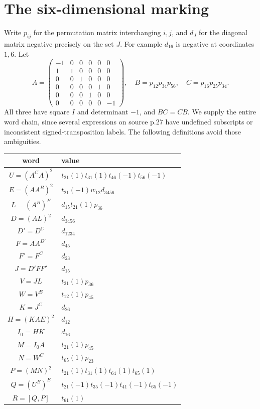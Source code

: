 \documentclass[11pt,a4paper]{article}
\begin{document}
\section{The six-dimensional marking}
Write $p_{ij}$ for the permutation matrix interchanging $i,j$, and
$d_J$ for the diagonal matrix negative precisely on the set $J$.
For example $d_{16}$ is negative at coordinates $1,6$.
Let
\[
 A=\begin{pmatrix}-1&0&0&0&0&0\\1&1&0&0&0&0\\0&0&1&0&0&0\\
 0&0&0&0&1&0\\0&0&0&1&0&0\\0&0&0&0&0&-1\end{pmatrix},\quad
 B=p_{12}p_{34}p_{56},\quad C=p_{16}p_{25}p_{34}.        \tag{4}
\]
All three have square $I$ and determinant $-1$, and $BC=CB$.
We supply the entire word chain, since several expressions on source
p.27 have undefined subscripts or inconsistent signed-transposition
labels. The following definitions avoid those ambiguities.
\begin{center}\small
\begin{tabular}{c|l}
word&value\\\hline
$U=(A^C A)^2$&$t_{21}(1)t_{31}(1)t_{46}(-1)t_{56}(-1)$\\
$E=(A A^B)^2$&$t_{21}(-1)w_{12}d_{3456}$\\
$L=(A^B)^E$&$d_{15}t_{21}(1)p_{36}$\\
$D=(AL)^2$&$d_{3456}$\\
$D'=D^C$&$d_{1234}$\\
$F=A A^{D'}$&$d_{45}$\\
$F'=F^C$&$d_{23}$\\
$J=D'FF'$&$d_{15}$\\
$V=JL$&$t_{21}(1)p_{36}$\\
$W=V^B$&$t_{12}(1)p_{45}$\\
$K=J^C$&$d_{26}$\\
$H=(KAE)^2$&$d_{12}$\\
$I_0=HK$&$d_{16}$\\
$M=I_0 A$&$t_{21}(1)p_{45}$\\
$N=W^C$&$t_{65}(1)p_{23}$\\
$P=(MN)^2$&$t_{21}(1)t_{31}(1)t_{64}(1)t_{65}(1)$\\
$Q=(U^B)^E$&$t_{21}(-1)t_{35}(-1)t_{41}(-1)t_{65}(-1)$\\
$R=[Q,P]$&$t_{61}(1)$
\end{tabular}
\end{center}
\end{document}
